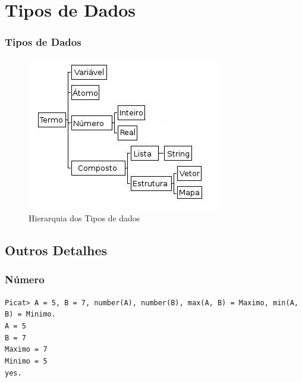 
\section{Tipos de Dados}

\begin{frame}
\frametitle{Tipos de Dados}
\begin{figure}[!ht]
\centering
\includegraphics[width=.6\textwidth]{figures/tipos_dados_picat_traduzido.jpg}
\caption{Hierarquia dos Tipos de dados}
\label{Hiera}
\end{figure}
\end{frame}


\subsection{Outros Detalhes}
\begin{frame}
    \frametitle{Número}
    \texttt{Picat> A = 5, B = 7, number(A), number(B),
    max(A, B) = Maximo, min(A, B) = Minimo.}\\
  
    \texttt{A = 5}\\
    \texttt{B = 7}\\
    \texttt{Maximo = 7}\\
    \texttt{Minimo = 5}\\
    \texttt{yes.}
\end{frame}





